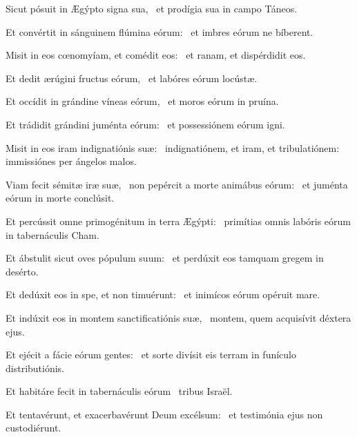 \item Sicut pósuit in Ægýpto signa sua,~\psstar{} et prodígia sua in campo Táneos.

\item Et convértit in sánguinem flúmina eórum:~\psstar{} et imbres eórum ne bíberent.

\item Misit in eos cœnomyíam, et comédit eos:~\psstar{} et ranam, et dispérdidit eos.

\item Et dedit ærúgini fructus eórum,~\psstar{} et labóres eórum locústæ.

\item Et occídit in grándine víneas eórum,~\psstar{} et moros eórum in pruína.

\item Et trádidit grándini juménta eórum:~\psstar{} et possessiónem eórum igni.

\item Misit in eos iram indignatiónis suæ:~\psstar{} indignatiónem, et iram, et tribulatiónem: immissiónes per ángelos malos.

\item Viam fecit sémitæ iræ suæ,~\pscross{} non pepércit a morte animábus eórum:~\psstar{} et juménta eórum in morte conclúsit.

\item Et percússit omne primogénitum in terra Ægýpti:~\psstar{} primítias omnis labóris eórum in tabernáculis Cham.

\item Et ábstulit sicut oves pópulum suum:~\psstar{} et perdúxit eos tamquam gregem in desérto.

\item Et dedúxit eos in spe, et non timuérunt:~\psstar{} et inimícos eórum opéruit mare.

\item Et indúxit eos in montem sanctificatiónis suæ,~\psstar{} montem, quem acquisívit déxtera ejus.

\item Et ejécit a fácie eórum gentes:~\psstar{} et sorte divísit eis terram in funículo distributiónis.

\item Et habitáre fecit in tabernáculis eórum~\psstar{} tribus Israël.

\item Et tentavérunt, et exacerbavérunt Deum excélsum:~\psstar{} et testimónia ejus non custodiérunt.

